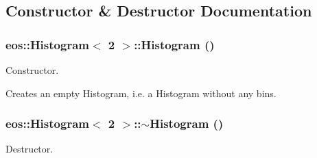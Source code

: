 \subsection{Constructor \& Destructor Documentation}
\hypertarget{classeos_1_1Histogram_3_012_01_4_a3d387d2bf355745d10ddc148737f63e3}{
\subsubsection[{Histogram}]{\setlength{\rightskip}{0pt plus 5cm}eos::Histogram$<$ 2 $>$::Histogram ()}}
\label{classeos_1_1Histogram_3_012_01_4_a3d387d2bf355745d10ddc148737f63e3}
Constructor.

Creates an empty Histogram, i.e. a Histogram without any bins. \hypertarget{classeos_1_1Histogram_3_012_01_4_a0c3188267bcbf7b492c6d3deb926b277}{
\subsubsection[{$\sim$Histogram}]{\setlength{\rightskip}{0pt plus 5cm}eos::Histogram$<$ 2 $>$::$\sim$Histogram ()}}
\label{classeos_1_1Histogram_3_012_01_4_a0c3188267bcbf7b492c6d3deb926b277}


Destructor. 

